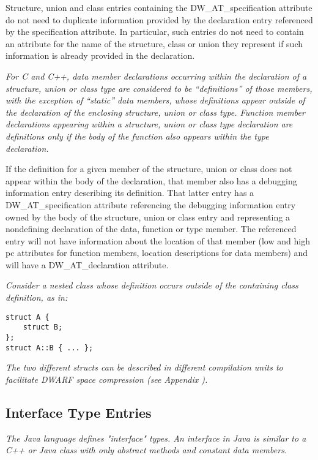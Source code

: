 Structure, union and class entries containing the
DW\_AT\_specification attribute do not need to duplicate
information provided by the declaration entry referenced by the
specification attribute.  In particular, such entries do not
need to contain an attribute for the name of the structure,
class or union they represent if such information is already
provided in the declaration.

\textit{For C and C++, data member declarations occurring within
the declaration of a structure, union or class type are
considered to be “definitions” of those members, with
the exception of “static” data members, whose definitions
appear outside of the declaration of the enclosing structure,
union or class type. Function member declarations appearing
within a structure, union or class type declaration are
definitions only if the body of the function also appears
within the type declaration.}

If the definition for a given member of the structure, union
or class does not appear within the body of the declaration,
that member also has a debugging information entry describing
its definition. That latter entry has a DW\_AT\_specification
attribute referencing the debugging information entry
owned by the body of the structure, union or class entry and
representing a non\dash defining declaration of the data, function
or type member. The referenced entry will not have information
about the location of that member (low and high pc attributes
for function members, location descriptions for data members)
and will have a DW\_AT\_declaration attribute.

\textit{Consider a nested class whose 
definition occurs outside of the containing class definition, as in:}

\begin{lstlisting}
struct A {
    struct B;
};
struct A::B { ... };
\end{lstlisting}

\textit{The two different structs can be described in 
different compilation units to 
facilitate DWARF space compression 
(see Appendix ).}

\subsection{Interface Type Entries}
\label{chap:interfacetypeentries}

\textit{The Java language defines "interface" types. An interface
in Java is similar to a C++ or Java class with only abstract
methods and constant data members.}

